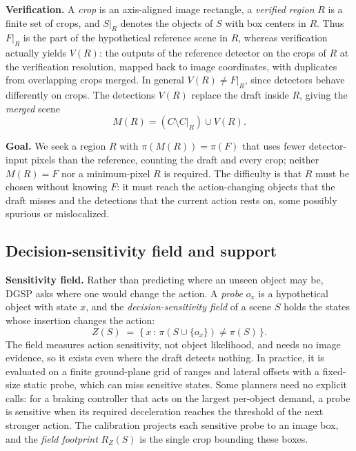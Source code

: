\documentclass[10pt,twocolumn,letterpaper]{article}
\newcommand{\method}{DGSP\xspace}
\newcommand{\draft}{C}            %
\newcommand{\full}{F}             %
\newcommand{\merged}{M}           %
\newcommand{\field}{Z}            %
\newcommand{\foot}{R_{\field}}    %
\newcommand{\policy}{\pi}         %
\theoremstyle{definition}
\theoremstyle{remark}
\begin{document}
\noindent\textbf{Verification.}
A \emph{crop} is an axis-aligned image rectangle, a \emph{verified region} $R$ is a finite set of crops, and $S|_R$ denotes the objects of $S$ with box centers in $R$.
Thus $\full|_R$ is the part of the hypothetical reference scene in $R$, whereas verification actually yields $V(R)$: the outputs of the reference detector on the crops of $R$ at the verification resolution, mapped back to image coordinates, with duplicates from overlapping crops merged.
In general $V(R)\neq\full|_R$, since detectors behave differently on crops.
The detections $V(R)$ replace the draft inside $R$, giving the \emph{merged} scene
\begin{equation}
\merged(R)=(\draft\setminus\draft|_R)\cup V(R).
\label{eq:merged}
\end{equation}

\noindent\textbf{Goal.}
We seek a region $R$ with $\policy(\merged(R))=\policy(\full)$ that uses fewer detector-input pixels than the reference, counting the draft and every crop; neither $\merged(R)=\full$ nor a minimum-pixel $R$ is required.
The difficulty is that $R$ must be chosen without knowing $\full$: it must reach the action-changing objects that the draft misses and the detections that the current action rests on, some possibly spurious or mislocalized.

\subsection{Decision-sensitivity field and support}
\label{sec:field}

\noindent\textbf{Sensitivity field.}
Rather than predicting where an unseen object may be, \method asks where one would change the action.
A \emph{probe} $o_x$ is a hypothetical object with state $x$, and the \emph{decision-sensitivity field} of a scene $S$ holds the states whose insertion changes the action:
\begin{equation}
\field(S) \;=\; \{\,x \,:\, \policy(S\cup\{o_x\})\neq\policy(S)\,\}.
\label{eq:field}
\end{equation}
The field measures action sensitivity, not object likelihood, and needs no image evidence, so it exists even where the draft detects nothing.
In practice, it is evaluated on a finite ground-plane grid of ranges and lateral offsets with a fixed-size static probe, which can miss sensitive states.
Some planners need no explicit calls: for a braking controller that acts on the largest per-object demand, a probe is sensitive when its required deceleration reaches the threshold of the next stronger action.
The calibration projects each sensitive probe to an image box, and the \emph{field footprint} $\foot(S)$ is the single crop bounding these boxes.
\end{document}
